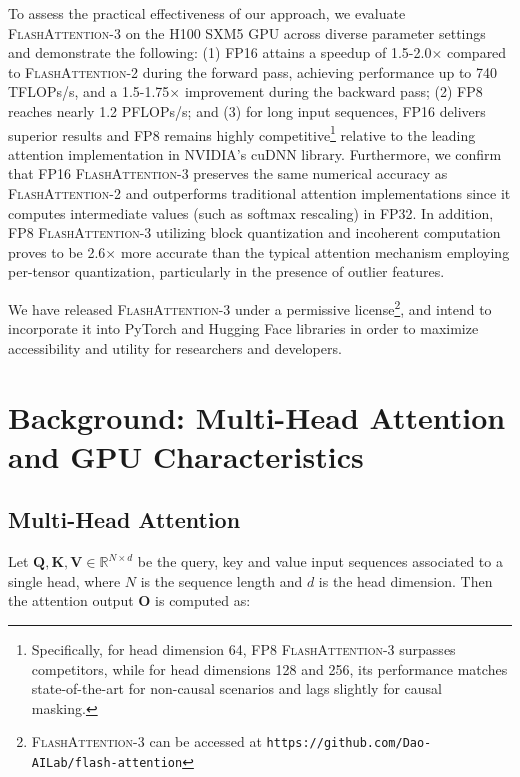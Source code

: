 To assess the practical effectiveness of our approach, we evaluate \textsc{FlashAttention-3} on the H100 SXM5 GPU across diverse parameter settings and demonstrate the following: (1) FP16 attains a speedup of 1.5-2.0$\times$ compared to \textsc{FlashAttention-2} during the forward pass, achieving performance up to 740 TFLOPs/s, and a 1.5-1.75$\times$ improvement during the backward pass; (2) FP8 reaches nearly 1.2 PFLOPs/s; and (3) for long input sequences, FP16 delivers superior results and FP8 remains highly competitive\footnote{Specifically, for head dimension 64, FP8 \textsc{FlashAttention-3} surpasses competitors, while for head dimensions 128 and 256, its performance matches state-of-the-art for non-causal scenarios and lags slightly for causal masking.} relative to the leading attention implementation in NVIDIA's cuDNN library. Furthermore, we confirm that FP16 \textsc{FlashAttention-3} preserves the same numerical accuracy as \textsc{FlashAttention-2} and outperforms traditional attention implementations since it computes intermediate values (such as softmax rescaling) in FP32. In addition, FP8 \textsc{FlashAttention-3} utilizing block quantization and incoherent computation proves to be 2.6$\times$ more accurate than the typical attention mechanism employing per-tensor quantization, particularly in the presence of outlier features.

We have released \textsc{FlashAttention-3} under a permissive license\footnote{\textsc{FlashAttention-3} can be accessed at \texttt{https://github.com/Dao-AILab/flash-attention}}, and intend to incorporate it into PyTorch and Hugging Face libraries in order to maximize accessibility and utility for researchers and developers.

\section{Background: Multi-Head Attention and GPU Characteristics}
\label{sec:background}

\subsection{Multi-Head Attention}
\label{subsec:multi_head_attn}

Let $\mathbf{Q}, \mathbf{K}, \mathbf{V} \in \mathbb{R}^{N \times d}$ be the query, key and value input sequences associated to a single head, where $N$ is the sequence length and $d$ is the head dimension. Then the attention output $\mathbf{O}$ is computed as:

